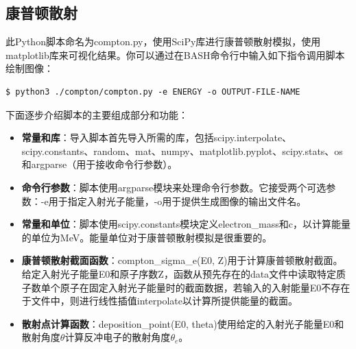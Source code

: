 \documentclass[12pt,a4paper]{article}%
\begin{document}
    
    \subsection{康普顿散射}
    此Python脚本命名为compton.py，使用SciPy库进行康普顿散射模拟，使用matplotlib库来可视化结果。你可以通过在BASH命令行中输入如下指令调用脚本绘制图像：    
    \begin{lstlisting}[style=mystyle,label=code:bash]
    $ python3 ./compton/compton.py -e ENERGY -o OUTPUT-FILE-NAME
    \end{lstlisting}
    
    下面逐步介绍脚本的主要组成部分和功能：
    
    \begin{tcolorbox}[width=16cm]
 
        \begin{itemize}
            \item \textbf{常量和库}：导入脚本首先导入所需的库，包括scipy.interpolate、scipy.constants、random、mat、numpy、matplotlib.pyplot、scipy.stats、os和argparse（用于接收命令行参数）。
    
            \item \textbf{命令行参数}：脚本使用argparse模块来处理命令行参数。它接受两个可选参数：-e用于指定入射光子能量，-o用于提供生成图像的输出文件名。
            
            \item \textbf{常量和单位}：脚本使用scipy.constants模块定义electron\_mass和c，以计算能量的单位为MeV。能量单位对于康普顿散射模拟是很重要的。
            
            \item \textbf{康普顿散射截面函数}：compton\_sigma\_e(E0, Z)用于计算康普顿散射截面。给定入射光子能量E0和原子序数Z，函数从预先存在的data文件中读取特定质子数单个原子在固定入射光子能量时的截面数据，若输入的入射能量E0不存在于文件中，则进行线性插值interpolate以计算所提供能量的截面。
    
            \item \textbf{散射点计算函数}：deposition\_point(E0, theta)使用给定的入射光子能量E0和散射角度$\theta$计算反冲电子的散射角度$\theta_e$。
            
            \end{itemize}
    \end{tcolorbox}  
    
\end{document}
